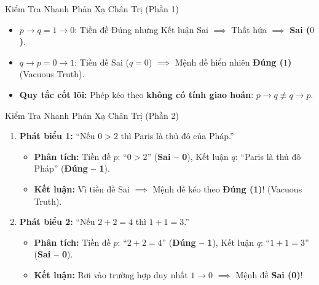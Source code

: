 \documentclass[aspectratio=169, 10pt]{beamer}
\begin{document}
\begin{frame}{Kiểm Tra Nhanh Phản Xạ Chân Trị (Phần 1)}
\begin{cozyTrap}
    \small
    \begin{itemize}
      \setlength{\itemsep}{2pt}
      \item $p \to q = 1 \to 0$: Tiền đề Đúng nhưng Kết luận Sai $\implies$ Thất hứa $\implies$ \textbf{\textcolor{cozyFalse}{Sai ($0$)}}.
      \item $q \to p = 0 \to 1$: Tiền đề Sai ($q=0$) $\implies$ Mệnh đề hiển nhiên \textbf{\textcolor{cozyTrue}{Đúng ($1$)}} (Vacuous Truth).
      \item \textbf{Quy tắc cốt lõi:} Phép kéo theo \textbf{không có tính giao hoán}: $p \to q \not\equiv q \to p$.
    \end{itemize}
  \end{cozyTrap}
\end{frame}

\begin{frame}{Kiểm Tra Nhanh Phản Xạ Chân Trị (Phần 2)}
  \begin{cozyExample}
    \small
    \begin{enumerate}
      \setlength{\itemsep}{4pt}
      \item \textbf{Phát biểu 1:} ``Nếu $0 > 2$ thì Paris là thủ đô của Pháp.''
      \begin{itemize}
        \setlength{\itemsep}{1pt}
        \item \textbf{Phân tích:} Tiền đề $p$: ``$0 > 2$'' (\textbf{\textcolor{cozyFalse}{Sai -- 0}}), Kết luận $q$: ``Paris là thủ đô Pháp'' (\textbf{\textcolor{cozyTrue}{Đúng -- 1}}).
        \item \textbf{Kết luận:} Vì tiền đề Sai $\implies$ Mệnh đề kéo theo \textbf{\textcolor{cozyTrue}{Đúng (1)}}! (Vacuous Truth).
      \end{itemize}

      \item \textbf{Phát biểu 2:} ``Nếu $2 + 2 = 4$ thì $1 + 1 = 3$.''
      \begin{itemize}
        \setlength{\itemsep}{1pt}
        \item \textbf{Phân tích:} Tiền đề $p$: ``$2 + 2 = 4$'' (\textbf{\textcolor{cozyTrue}{Đúng -- 1}}), Kết luận $q$: ``$1 + 1 = 3$'' (\textbf{\textcolor{cozyFalse}{Sai -- 0}}).
        \item \textbf{Kết luận:} Rơi vào trường hợp duy nhất $1 \to 0$ $\implies$ Mệnh đề \textbf{\textcolor{cozyFalse}{Sai (0)}}!
      \end{itemize}


\end{enumerate}
\end{cozyExample}
\end{frame}
\end{document}

